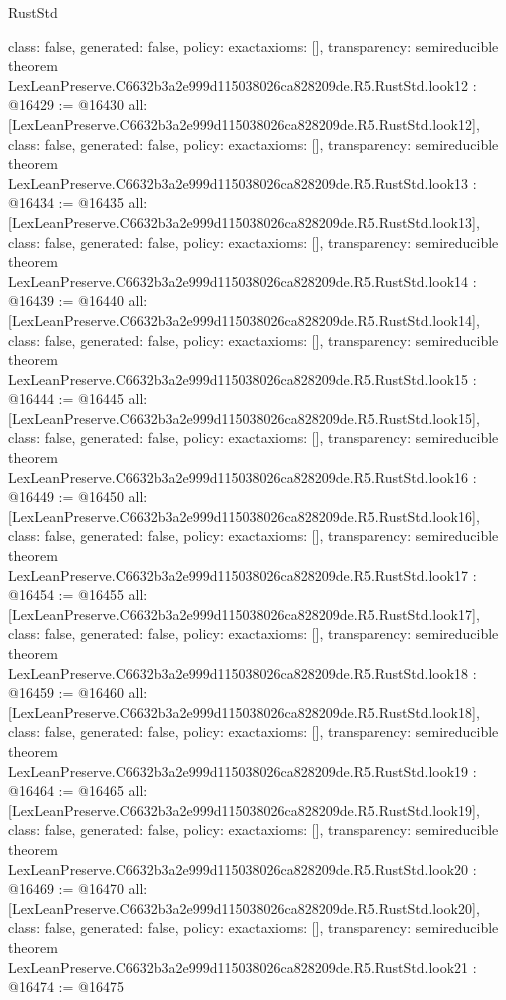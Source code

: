 \begin{lexlean}{RustStd}
\begin{coremodule}
{  class: false,
  generated: false,
  policy: exact{axioms: []},
  transparency: semireducible
}
theorem LexLeanPreserve.C6632b3a2e999d115038026ca828209de.R5.RustStd.look12 : @16429 := @16430 {
  all: [LexLeanPreserve.C6632b3a2e999d115038026ca828209de.R5.RustStd.look12],
  class: false,
  generated: false,
  policy: exact{axioms: []},
  transparency: semireducible
}
theorem LexLeanPreserve.C6632b3a2e999d115038026ca828209de.R5.RustStd.look13 : @16434 := @16435 {
  all: [LexLeanPreserve.C6632b3a2e999d115038026ca828209de.R5.RustStd.look13],
  class: false,
  generated: false,
  policy: exact{axioms: []},
  transparency: semireducible
}
theorem LexLeanPreserve.C6632b3a2e999d115038026ca828209de.R5.RustStd.look14 : @16439 := @16440 {
  all: [LexLeanPreserve.C6632b3a2e999d115038026ca828209de.R5.RustStd.look14],
  class: false,
  generated: false,
  policy: exact{axioms: []},
  transparency: semireducible
}
theorem LexLeanPreserve.C6632b3a2e999d115038026ca828209de.R5.RustStd.look15 : @16444 := @16445 {
  all: [LexLeanPreserve.C6632b3a2e999d115038026ca828209de.R5.RustStd.look15],
  class: false,
  generated: false,
  policy: exact{axioms: []},
  transparency: semireducible
}
theorem LexLeanPreserve.C6632b3a2e999d115038026ca828209de.R5.RustStd.look16 : @16449 := @16450 {
  all: [LexLeanPreserve.C6632b3a2e999d115038026ca828209de.R5.RustStd.look16],
  class: false,
  generated: false,
  policy: exact{axioms: []},
  transparency: semireducible
}
theorem LexLeanPreserve.C6632b3a2e999d115038026ca828209de.R5.RustStd.look17 : @16454 := @16455 {
  all: [LexLeanPreserve.C6632b3a2e999d115038026ca828209de.R5.RustStd.look17],
  class: false,
  generated: false,
  policy: exact{axioms: []},
  transparency: semireducible
}
theorem LexLeanPreserve.C6632b3a2e999d115038026ca828209de.R5.RustStd.look18 : @16459 := @16460 {
  all: [LexLeanPreserve.C6632b3a2e999d115038026ca828209de.R5.RustStd.look18],
  class: false,
  generated: false,
  policy: exact{axioms: []},
  transparency: semireducible
}
theorem LexLeanPreserve.C6632b3a2e999d115038026ca828209de.R5.RustStd.look19 : @16464 := @16465 {
  all: [LexLeanPreserve.C6632b3a2e999d115038026ca828209de.R5.RustStd.look19],
  class: false,
  generated: false,
  policy: exact{axioms: []},
  transparency: semireducible
}
theorem LexLeanPreserve.C6632b3a2e999d115038026ca828209de.R5.RustStd.look20 : @16469 := @16470 {
  all: [LexLeanPreserve.C6632b3a2e999d115038026ca828209de.R5.RustStd.look20],
  class: false,
  generated: false,
  policy: exact{axioms: []},
  transparency: semireducible
}
theorem LexLeanPreserve.C6632b3a2e999d115038026ca828209de.R5.RustStd.look21 : @16474 := @16475 {
}
\end{coremodule}
\end{lexlean}
